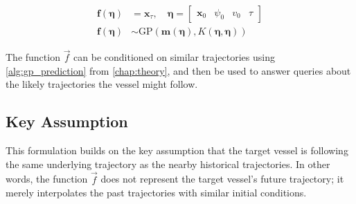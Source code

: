 \begin{subequations}\label{eq:gp_direct}
    \begin{align}
        \boldsymbol{f}(\boldsymbol{\eta}) & = \boldsymbol{x}_{\tau} \label{eq:gp_direct_f}, \quad \boldsymbol{\eta} = \begin{bmatrix} \boldsymbol{x}_0 & \psi_0 & v_0 & \tau\end{bmatrix}                   \\
        \boldsymbol{f}(\boldsymbol{\eta}) & \sim \text{GP}(\boldsymbol{m}(\boldsymbol{\eta}), K(\boldsymbol{\eta}, \boldsymbol{\eta}))\label{eq:gp_direct_f_dist}
    \end{align}
\end{subequations}

The function $\vec{f}$ can be conditioned on similar trajectories using \cref{alg:gp_prediction} from \cref{chap:theory}, and then be used to answer queries about the likely trajectories the vessel might follow.

\subsection{Key Assumption}
This formulation builds on the key assumption that the target vessel is following the same underlying trajectory as the nearby historical trajectories. In other words, the function $\vec{f}$ does not represent the target vessel's future trajectory; it merely interpolates the past trajectories with similar initial conditions. 



